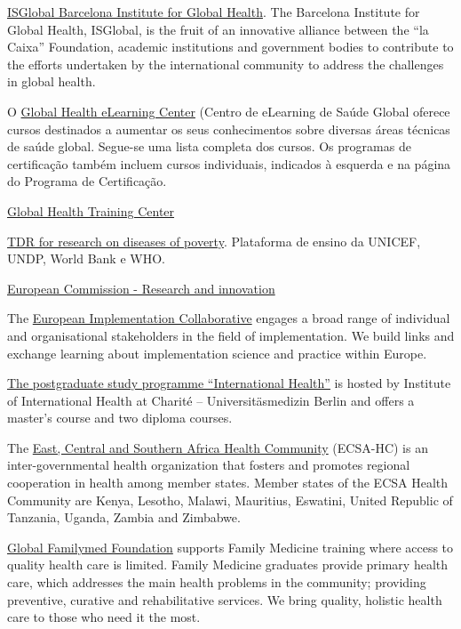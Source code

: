 \documentclass[
  letterpaper,
  DIV=11,
  numbers=noendperiod]{scrreprt}
\begin{document}
\href{https://www.isglobal.org/en/about-us}{ISGlobal Barcelona Institute
for Global Health}. The Barcelona Institute for Global Health, ISGlobal,
is the fruit of an innovative alliance between the ``la Caixa''
Foundation, academic institutions and government bodies to contribute to
the efforts undertaken by the international community to address the
challenges in global health.

O \href{https://www.globalhealthlearning.org/pt/courses}{Global Health
eLearning Center} (Centro de eLearning de Saúde Global oferece cursos
destinados a aumentar os seus conhecimentos sobre diversas áreas
técnicas de saúde global. Segue-se uma lista completa dos cursos. Os
programas de certificação também incluem cursos individuais, indicados à
esquerda e na página do Programa de Certificação.

\href{https://globalhealthtrainingcentre.tghn.org/elearning/}{Global
Health Training Center}

\href{https://tdrmooc.org/login?next=/dashboard}{TDR for research on
diseases of poverty}. Plataforma de ensino da UNICEF, UNDP, World Bank e
WHO.

\href{https://research-and-innovation.ec.europa.eu/funding/funding-opportunities/funding-programmes-and-open-calls/horizon-europe/cluster-1-health_en}{European
Commission - Research and innovation}

The \href{https://implementation.eu/}{European Implementation
Collaborative} engages a broad range of individual and organisational
stakeholders in the field of implementation. We build links and exchange
learning about implementation science and practice within Europe.

\href{https://internationalhealth.charite.de/en/}{The postgraduate study
programme ``International Health''} is hosted by Institute of
International Health at Charité -- Universitäsmedizin Berlin and offers
a master's course and two diploma courses.

The \href{https://ecsahc.org/ecsa-hc-at-a-glance/}{East, Central and
Southern Africa Health Community} (ECSA-HC) is an inter-governmental
health organization that fosters and promotes regional cooperation in
health among member states. Member states of the ECSA Health Community
are Kenya, Lesotho, Malawi, Mauritius, Eswatini, United Republic of
Tanzania, Uganda, Zambia and Zimbabwe.

\href{https://www.globalfamilymed.org/}{Global Familymed Foundation}
supports Family Medicine training where access to quality health care is
limited. Family Medicine graduates provide primary health care, which
addresses the main health problems in the community; providing
preventive, curative and rehabilitative services. We bring quality,
holistic health care to those who need it the most.
\end{document}
